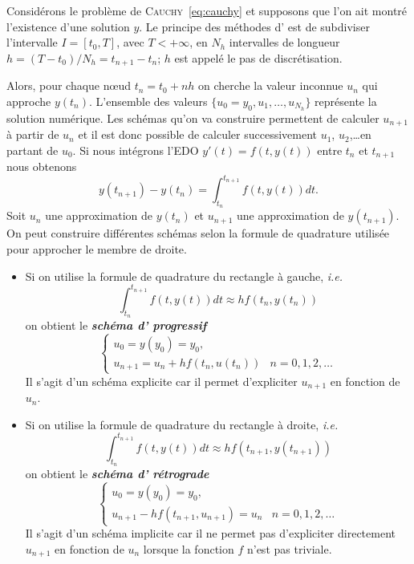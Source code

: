 \documentclass[a4paper,11pt]{article}
\theoremstyle{plain}
\theoremstyle{definition}
\theoremstyle{remark}
\newcommand{\ie}{\textit{i.e.}\xspace}
\newcommand{\nom}[1]{\bsc{#1}\xspace}%
\newcommand{\euler}{\nom{Euler}}
\begin{document}
Considérons le problème de \textsc{Cauchy}~\eqref{eq:cauchy} et supposons que l'on ait montré l'existence d'une solution $y$. Le principe des méthodes d'\euler est de subdiviser l'intervalle $I=[t_0,T]$, avec $T<+\infty$, en $N_h$ intervalles de longueur $h=(T-t_0)/N_h=t_{n+1}-t_n$; $h$ est appelé le pas de discrétisation. 
\begin{center}
\end{center}
Alors, pour chaque nœud $t_n=t_0 + nh$ on cherche la valeur inconnue $u_n$ qui approche $y(t_n)$. L'ensemble des valeurs $\{u_0 = y_0, u_1,\dots , u_{N_h} \}$ représente la solution numérique. Les schémas qu'on va construire permettent de calculer $u_{n+1}$ à partir de $u_n$ et il est donc possible de calculer successivement $u_1$, $u_2$,\dots en partant de $u_0$. Si nous intégrons l'EDO $y'(t)=f(t,y(t))$ entre $t_n$ et $t_{n+1}$ nous obtenons
\[
y(t_{n+1})-y(t_n)=\int_{t_n}^{t_{n+1}} f(t,y(t))dt.
\]
Soit $u_n$ une approximation de $y(t_n)$ et $u_{n+1}$ une approximation de $y(t_{n+1})$. On peut construire différentes schémas selon la formule de quadrature utilisée pour approcher le membre de droite. 
\begin{itemize}
\item Si on utilise la formule de quadrature du rectangle à gauche, \ie
\[
\int_{t_n}^{t_{n+1}} f(t,y(t))dt\approx h f(t_n,y(t_n))
\]
on obtient le \textbf{\emph{schéma d'\euler progressif}}
\[
\begin{cases}
u_0=y(y_0)=y_0,\\
u_{n+1}=u_n+h f(t_n,u(t_n))& n=0,1,2,\dots
\end{cases}
\]
Il s'agit d'un schéma explicite car il permet d'expliciter $u_{n+1}$ en fonction de $u_n$.
\item Si on utilise la formule de quadrature du rectangle à droite, \ie
\[
\int_{t_n}^{t_{n+1}} f(t,y(t))dt\approx h f(t_{n+1},y(t_{n+1}))
\]
on obtient le \textbf{\emph{schéma d'\euler rétrograde}}
\[
\begin{cases}
u_0=y(y_0)=y_0,\\
u_{n+1}-h f(t_{n+1},u_{n+1})=u_n& n=0,1,2,\dots
\end{cases}
\]
Il s'agit d'un schéma implicite car il ne permet pas d'expliciter directement $u_{n+1}$ en fonction de $u_n$ lorsque la fonction $f$ n'est pas triviale. \end{itemize}
\end{document}
